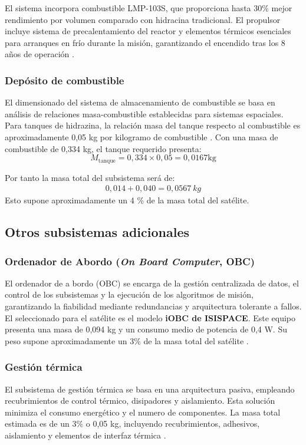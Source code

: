El sistema incorpora combustible LMP-103S, que proporciona hasta 30\% mejor rendimiento por volumen comparado con hidracina tradicional. El propulsor incluye sistema de precalentamiento del reactor y elementos térmicos esenciales para arranques en frío durante la misión, garantizando el encendido tras los 8 años de operación \cite{ECAPS_100mN_HPGP}.

\subsubsection{Depósito de combustible}

El dimensionado del sistema de almacenamiento de combustible se basa en análisis de relaciones masa-combustible establecidas para sistemas espaciales. Para tanques de hidrazina, la relación masa del tanque respecto al combustible es aproximadamente 0,05 kg por kilogramo de combustible \cite{smad2002spacecraft}.
Con una masa de combustible de 0,334 kg, el tanque requerido presenta:
\begin{equation}
M_{\text{tanque}} = 0,334 \times 0,05 = 0,0167\text{kg}
\end{equation}

Por tanto la masa total del subsistema será de: 
\begin{align}
    0,014 + 0,040 = 0,0567\ kg
\end{align}
Esto supone aproximadamente un 4 \% de la masa total del satélite.

\subsection{Otros subsistemas adicionales}
\subsubsection{Ordenador de Abordo (\textit{On Board Computer}, OBC)}

El ordenador de a bordo (OBC) se encarga de la gestión centralizada de datos, el control de los subsistemas y la ejecución de los algoritmos de misión, garantizando la fiabilidad mediante redundancias y arquitectura tolerante a fallos. El seleccionado para el satélite es el modelo \textbf{iOBC de ISISPACE}. Este equipo presenta una masa de 0,094 kg y un consumo medio de potencia de 0,4 W. Su peso supone aproximadamente un 3\% de la masa total del satélite \cite{isisobc}.


\subsubsection{Gestión térmica}

El subsistema de gestión térmica se basa en una arquitectura pasiva, empleando recubrimientos de control térmico, disipadores y aislamiento. Esta solución minimiza el consumo energético y el numero de componentes. La masa total estimada es de un 3\% o  0,05 kg, incluyendo recubrimientos, adhesivos, aislamiento y elementos de interfaz térmica \cite{guzman2025thermal} \cite{nasa2025thermal}.